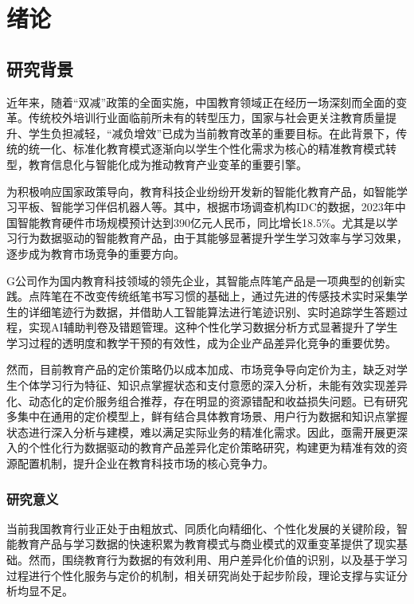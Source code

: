 

\chapter{绪论}
\label{chpater:introduction}

\section{研究背景}

近年来，随着“双减”政策的全面实施，中国教育领域正在经历一场深刻而全面的变革。传统校外培训行业面临前所未有的转型压力，国家与社会更关注教育质量提升、学生负担减轻，“减负增效”已成为当前教育改革的重要目标。在此背景下，传统的统一化、标准化教育模式逐渐向以学生个性化需求为核心的精准教育模式转型，教育信息化与智能化成为推动教育产业变革的重要引擎。

为积极响应国家政策导向，教育科技企业纷纷开发新的智能化教育产品，如智能学习平板、智能学习伴侣机器人等。其中，根据市场调查机构IDC的数据，2023年中国智能教育硬件市场规模预计达到390亿元人民币，同比增长18.5\%。尤其是以学习行为数据驱动的智能教育产品，由于其能够显著提升学生学习效率与学习效果，逐步成为教育市场竞争的重要方向。

G公司作为国内教育科技领域的领先企业，其智能点阵笔产品是一项典型的创新实践。点阵笔在不改变传统纸笔书写习惯的基础上，通过先进的传感技术实时采集学生的详细笔迹行为数据，并借助人工智能算法进行笔迹识别、实时追踪学生答题过程，实现AI辅助判卷及错题管理。这种个性化学习数据分析方式显著提升了学生学习过程的透明度和教学干预的有效性，成为企业产品差异化竞争的重要优势。

然而，目前教育产品的定价策略仍以成本加成、市场竞争导向定价为主，缺乏对学生个体学习行为特征、知识点掌握状态和支付意愿的深入分析，未能有效实现差异化、动态化的定价服务组合推荐，存在明显的资源错配和收益损失问题。已有研究多集中在通用的定价模型上，鲜有结合具体教育场景、用户行为数据和知识点掌握状态进行深入分析与建模，难以满足实际业务的精准化需求。因此，亟需开展更深入的个性化行为数据驱动的教育产品差异化定价策略研究，构建更为精准有效的资源配置机制，提升企业在教育科技市场的核心竞争力。


\subsection{研究意义}

当前我国教育行业正处于由粗放式、同质化向精细化、个性化发展的关键阶段，智能教育产品与学习数据的快速积累为教育模式与商业模式的双重变革提供了现实基础。然而，围绕教育行为数据的有效利用、用户差异化价值的识别，以及基于学习过程进行个性化服务与定价的机制，相关研究尚处于起步阶段，理论支撑与实证分析均显不足。

